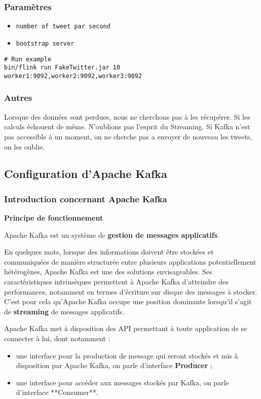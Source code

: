 \documentclass[a4paper,oneside,11pt]{article}
\begin{document}
\subsubsection{Paramètres}

\begin{itemize}
\item \verb!number of tweet par second! 
\item \verb!bootstrap server!
\end{itemize}

\begin{verbatim}
# Run example
bin/flink run FakeTwitter.jar 10 worker1:9092,worker2:9092,worker3:9092
\end{verbatim}

\subsubsection{Autres}

Lorsque des données sont perdues, nous ne cherchons pas à les récupérer. Si les calculs échouent de même. N'oublions pas l'esprit du Streaming. 
Si Kafka n'est pas accessible à un moment, on ne cherche pas a envoyer de nouveau les tweets, on les oublie. 



\subsection{Configuration d'Apache Kafka}

\subsubsection{Introduction concernant Apache Kafka}

\textbf{Principe de fonctionnement}

Apache Kafka est un système de \textbf{gestion de messages applicatifs}. 

En quelques mots, lorsque des informations doivent être stockées et 
communiquées de manière structurée entre plusieurs applications 
potentiellement hétérogènes, Apache Kafka est une des solutions 
envisageables. Ses caractéristiques intrinsèques permettent à Apache 
Kafka d'atteindre des performances, notamment en termes d'écriture
sur disque des messages à stocker. C'est pour cela qu'Apache Kafka 
occupe une position dominante lorsqu'il s'agit de \textbf{streaming} de
messages applicatifs.

Apache Kafka met à disposition des API permettant à toute application 
de se connecter à lui, dont notamment :
\begin{itemize}
\item une interface pour la production de message qui seront stockés 
et mis à disposition par Apache Kafka, on parle d'interface 
\textbf{Producer} ;
\item une interface pour accéder aux messages stockés par Kafka, on parle d'interface **Consumer**.
\end{itemize}
\end{document}
